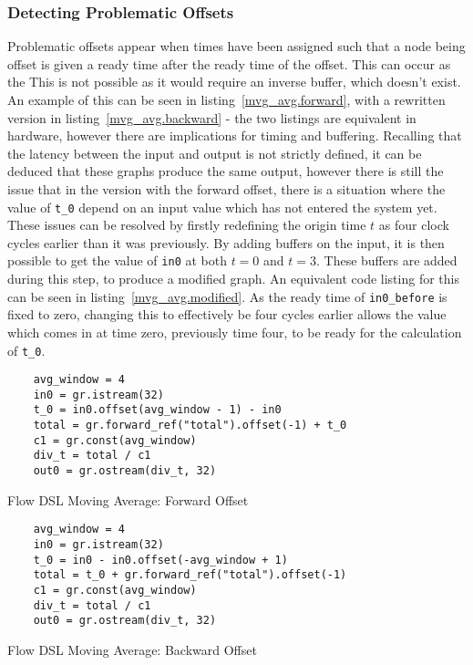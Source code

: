\subsubsection{Detecting Problematic Offsets}
Problematic offsets appear when times have been assigned such that a node being offset is given a ready time after the ready time of the offset. This can occur as the  This is not possible as it would require an inverse buffer, which doesn't exist. An example of this can be seen in listing \ref{mvg_avg.forward}, with a rewritten version in listing \ref{mvg_avg.backward} \hyphen{} the two listings are equivalent in hardware, however there are implications for timing and buffering. Recalling that the latency between the input and output is not strictly defined, it can be deduced that these graphs produce the same output, however there is still the issue that in the version with the forward offset, there is a situation where the value of \lstinline|t_0| depend on an input value which has not entered the system yet. These issues can be resolved by firstly redefining the origin time $t$ as four clock cycles earlier than it was previously. By adding buffers on the input, it is then possible to get the value of \lstinline|in0| at both $t=0$ and $t=3$. These buffers are added during this step, to produce a modified graph. An equivalent code listing for this can be seen in listing \ref{mvg_avg.modified}. As the ready time of \lstinline|in0_before| is fixed to zero, changing this to effectively be four cycles earlier allows the value which comes in at time zero, previously time four, to be ready for the calculation of \lstinline|t_0|. 

\renewcommand\theFancyVerbLine{\arabic{FancyVerbLine}}
\begin{listing}[H]
  \begin{verbatim}
    avg_window = 4
    in0 = gr.istream(32)
    t_0 = in0.offset(avg_window - 1) - in0
    total = gr.forward_ref("total").offset(-1) + t_0
    c1 = gr.const(avg_window)
    div_t = total / c1
    out0 = gr.ostream(div_t, 32)
  \end{verbatim}
  \caption{Flow DSL Moving Average: Forward Offset}\label{mvg_avg.forward}
\end{listing}

\renewcommand\theFancyVerbLine{\arabic{FancyVerbLine}}
\begin{listing}[H]
  \begin{verbatim}
    avg_window = 4
    in0 = gr.istream(32)
    t_0 = in0 - in0.offset(-avg_window + 1)
    total = t_0 + gr.forward_ref("total").offset(-1)
    c1 = gr.const(avg_window)
    div_t = total / c1
    out0 = gr.ostream(div_t, 32)
  \end{verbatim}
  \caption{Flow DSL Moving Average: Backward Offset}\label{mvg_avg.backward}
\end{listing}

